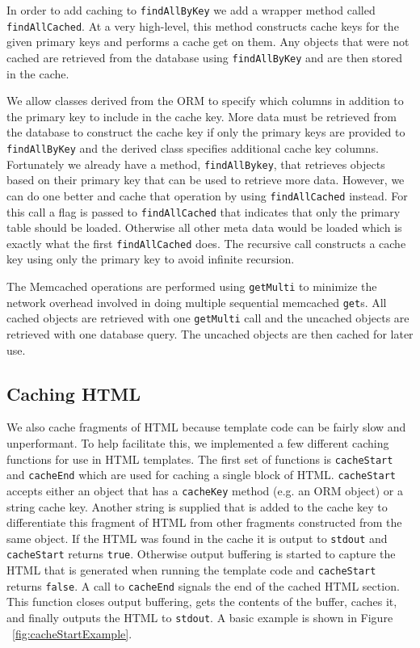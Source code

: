 \documentclass[12pt]{ucthesis}
\begin{document}
In order to add caching to {\tt findAllByKey} we add a wrapper method called {\tt findAllCached}.
At a very high-level, this method constructs cache keys for the given primary keys and performs a cache get on them.
Any objects that were not cached are retrieved from the database using {\tt findAllByKey} and are then stored in the cache.

We allow classes derived from the ORM to specify which columns in addition to the primary key to include in the cache key.
More data must be retrieved from the database to construct the cache key if only the primary keys are provided to {\tt findAllByKey} and the derived class specifies additional cache key columns.
Fortunately we already have a method, {\tt findAllBykey}, that retrieves objects based on their primary key that can be used to retrieve more data.
However, we can do one better and cache that operation by using {\tt findAllCached} instead.
For this call a flag is passed to {\tt findAllCached} that indicates that only the primary table should be loaded.
Otherwise all other meta data would be loaded which is exactly what the first {\tt findAllCached} does.
The recursive call constructs a cache key using only the primary key to avoid infinite recursion.

The Memcached operations are performed using {\tt getMulti} to minimize the network overhead involved in doing multiple sequential memcached {\tt get}s.
All cached objects are retrieved with one {\tt getMulti} call and the uncached objects are retrieved with one database query.
The uncached objects are then cached for later use.

\subsection{Caching HTML}
We also cache fragments of HTML because template code can be fairly slow and unperformant.
To help facilitate this, we implemented a few different caching functions for use in HTML templates.
The first set of functions is {\tt cacheStart} and {\tt cacheEnd} which are used for caching a single block of HTML.
{\tt cacheStart} accepts either an object that has a {\tt cacheKey} method (e.g. an ORM object) or a string cache key.
Another string is supplied that is added to the cache key to differentiate this fragment of HTML from other fragments constructed from the same object.
If the HTML was found in the cache it is output to {\tt stdout} and {\tt cacheStart} returns {\tt true}.
Otherwise output buffering is started to capture the HTML that is generated when running the template code and {\tt cacheStart} returns {\tt false}.
A call to {\tt cacheEnd} signals the end of the cached HTML section.
This function closes output buffering, gets the contents of the buffer, caches it, and finally outputs the HTML to {\tt stdout}.
A basic example is shown in Figure ~\ref{fig:cacheStartExample}.
\end{document}
